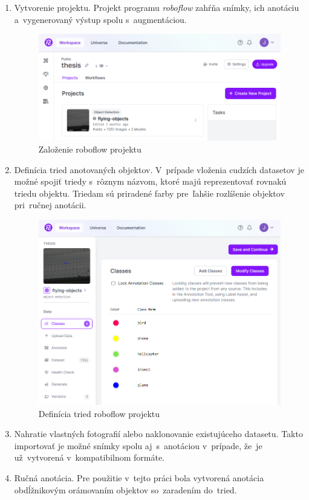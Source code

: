         \begin{enumerate}
            \item Vytvorenie projektu. Projekt programu \emph{roboflow} zahŕňa snímky, ich anotáciu a~vygenerovaný výstup spolu s~augmentáciou.

            \begin{figure}[H]
                \centering
                \includegraphics[width=.5\textwidth]{obrazky/roboflow/projects.png}
                \caption{Založenie roboflow projektu}
            \end{figure}

            \item Definícia tried anotovaných objektov. V~prípade vloženia cudzích datasetov je možné spojiť triedy s~rôznym názvom, ktoré majú reprezentovať rovnakú triedu objektu. Triedam sú priradené farby pre~ľahšie rozlíšenie objektov pri~ručnej anotácii.

            \begin{figure}[H]
                \centering
                \includegraphics[width=.5\textwidth]{obrazky/roboflow/classes edit.png}
                \caption{Definícia tried roboflow projektu}
            \end{figure}

            \item Nahratie vlastných fotografií alebo naklonovanie existujúceho datasetu. Takto importovať je možné snímky spolu aj~s~anotáciou v~prípade, že~je už~vytvorená v~kompatibilnom formáte.

            \item Ručná anotácia. Pre použitie v~tejto práci bola vytvorená anotácia obdĺžnikovým orámovaním objektov so~zaradením do~tried.


\end{enumerate}
